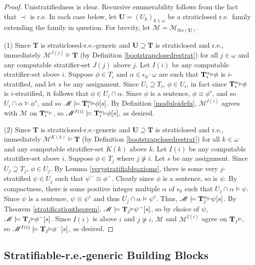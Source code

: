 \documentclass[reqno]{article}
\theoremstyle{definition}
\def\M{\mathscr{M}}
\def\T{\mathbf{T}}
\def\U{\mathbf{U}}
\def\epom{\epsilon_0\cdot\omega}
\renewcommand{\Pr}[1]{\T_{#1}\mbox{\small${\vDash}$}}
\newcommand{\Prr}[2]{\T^{#1}_{#2}\mbox{\small${\vDash}$}}
\newcommand{\str}[1]{\mathrm{Str}(#1)} \newcommand{\Str}[1]{\str{#1}}
\begin{document}
\begin{proof}
Unistratifiedness is clear.
Recursive enumerability follows from the fact that $\prec$ is r.e.
In each case below, let $\U=(U_k)_{k\in\omega}$ be a straticlosed r.e.~family
extending the family in question. For brevity, let $\M=\M_{\str\U}$.

\item
(1)
Since $\T$ is straticlosed-r.e.-generic and $\U\supseteq \T$ is straticlosed and r.e.,
immediately $\M^{J(j)}\models\T$ (by Definition \ref{bootstrapclosedrestrat})
for all $j\in\omega$ and any computable stratifier-set $J(j)$ above $j$.
Let $I(i)$ be any computable stratifier-set above $i$.
Suppose $\phi\in T_i$ and $\alpha\in\epom$ are such that $\Prr\alpha i\phi$
is $i$-stratified, and let $s$ be any assignment.
Since $U_i\supseteq T_i$, $\phi\in U_i$, in fact since $\Prr\alpha i\phi$ is $i$-stratified,
it follows that $\phi\in U_i\cap\alpha$. Since $\phi$ is a sentence,
$\phi\equiv \phi^s$, and so
$U_i\cap\alpha\models\phi^s$, and so $\M\models \Prr\alpha i\phi[s]$.
By Definition \ref{moduloidefn}, $\M^{I(i)}$ agrees with $\M$ on $\Prr \alpha i$,
so $\M^{I(i)}\models \Prr\alpha i\phi[s]$, as desired.

\item
(2)
Since $\T$ is straticlosed-r.e.-generic and $\U\supseteq \T$ is straticlosed and r.e.,
immediately $\M^{K(k)}\models\T$ (by Definition \ref{bootstrapclosedrestrat})
for all $k\in\omega$ and any computable stratifier-set $K(k)$ above $k$.
Let $I(i)$ be any computable stratifier-set above $i$.
Suppose $\phi\in T_j$ where $j\not\succeq i$. Let $s$ be any assignment.
Since $U_j\supseteq T_j$, $\phi\in U_j$.
By Lemma \ref{verystratifiableaxioms}, there is some very $j$-stratified
$\psi\in U_j$ such that $\psi^-\equiv\phi^-$.
Clearly since $\phi$ is a sentence, so is $\psi$.
By compactness, there is some positive integer multiple $\alpha$ of $\epsilon_0$
such that $U_j\cap\alpha\models \psi$. Since $\psi$ is a sentence,
$\psi\equiv \psi^s$ and thus
$U_j\cap\alpha\models \psi^s$.
Thus, $\M\models\Prr\alpha j \psi[s]$.
By Theorem \ref{stratificationtheorem},
$\M\models\Pr j\psi^-[s]$, so by choice of $\psi$, $\M\models\Pr j\phi^-[s]$.
Since $I(i)$ is above $i$ and $j\not\succeq i$, $\M$ and $\M^{I(i)}$
agree on $\Pr j$, so $\M^{I(i)}\models \Pr j\phi^-[s]$, as desired.
\end{proof}

\subsection{Stratifiable-r.e.-generic Building Blocks}
\end{document}
